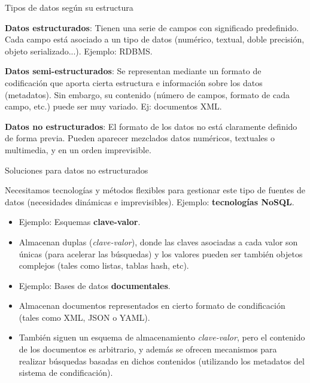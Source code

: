 \begin{frame}{Tipos de datos según su estructura}

\begin{wideitemize}
  \item \textbf{Datos estructurados}: Tienen una serie de campos con significado
   predefinido. Cada campo está asociado a un tipo de datos (numérico, textual,
   doble precisión, objeto serializado...). Ejemplo: RDBMS.
   
   \item \textbf{Datos semi-estructurados}: Se representan mediante un formato
   de codificación que aporta cierta estructura e información sobre los datos
   (metadatos). Sin embargo, su contenido (número de campos, formato de cada
   campo, etc.) puede ser muy variado. Ej: documentos XML.
   
   \item \textbf{Datos no estructurados}: El formato de los datos no está claramente
   definido de forma previa. Pueden aparecer mezclados datos numéricos, textuales
   o multimedia, y en un orden imprevisible.

\end{wideitemize}

\end{frame}


\begin{frame}{Soluciones para datos no estructurados}
    \begin{wideitemize}
     \item Necesitamos tecnologías y métodos flexibles para gestionar este tipo de
     fuentes de datos (necesidades dinámicas e imprevisibles). Ejemplo:
     \textbf{tecnologías NoSQL}.
     \begin{itemize}
      \item Ejemplo: Esquemas \textbf{clave-valor}.
      
      \item Almacenan duplas (\textit{clave-valor}), donde las claves asociadas a
      cada valor son únicas (para acelerar las búsquedas) y los valores pueden ser
      también objetos complejos (tales como listas, tablas hash, etc).
      
      \item Ejemplo: Bases de datos \textbf{documentales}.
      
      \item Almacenan documentos representados en cierto formato de condificación
      (tales como XML, JSON o YAML).
      
      \item También siguen un esquema de almacenamiento \textit{clave-valor}, pero
      el contenido de los documentos es arbitrario, y además se ofrecen mecanismos para
      realizar búsquedas basadas en dichos contenidos (utilizando los metadatos del
      sistema de condificación).
     \end{itemize}

    \end{wideitemize}

\end{frame}

